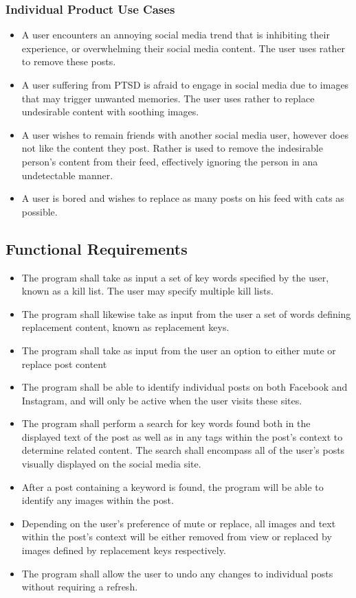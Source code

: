 \documentclass[12pt, titlepage]{article}
\begin{document}
\subsubsection{Individual Product Use Cases}
\begin{itemize}
  \item A user encounters an annoying social media trend that is inhibiting their experience, or overwhelming their social media content. The user uses rather to remove these posts.
  \item A user suffering from PTSD is afraid to engage in social media due to images that may trigger unwanted memories. The user uses rather to replace undesirable content with soothing images.
  \item A user wishes to remain friends with another social media user, however does not like the content they post. Rather is used to remove the indesirable person's content from their feed, effectively ignoring the person in ana undetectable manner.
  \item A user is bored and wishes to replace as many posts on his feed with cats as possible.
  
\end{itemize}

\subsection{Functional Requirements}
\begin{itemize}
  \item The program shall take as input a set of key words specified by the user, known as a kill list. The user may specify multiple kill lists.
  \item The program shall likewise take as input from the user a set of words defining replacement content, known as replacement keys.
  \item The program shall take as input from the user an option to either mute or replace post content
  \item The program shall be able to identify individual posts on both Facebook and Instagram, and will only be active when the user visits these sites.
  \item The program shall perform a search for key words found both in the displayed text of the post as well as in any tags within the post's context to determine related content. The search shall encompass all of the user's posts visually displayed on the social media site.
  \item After a post containing a keyword is found, the program will be able to identify any images within the post.
  \item Depending on the user's preference of mute or replace, all images and text within the post's context will be either removed from view or replaced by images defined by replacement keys respectively.
  \item The program shall allow the user to undo any changes to individual posts without requiring a refresh.
\end{itemize}
\end{document}
